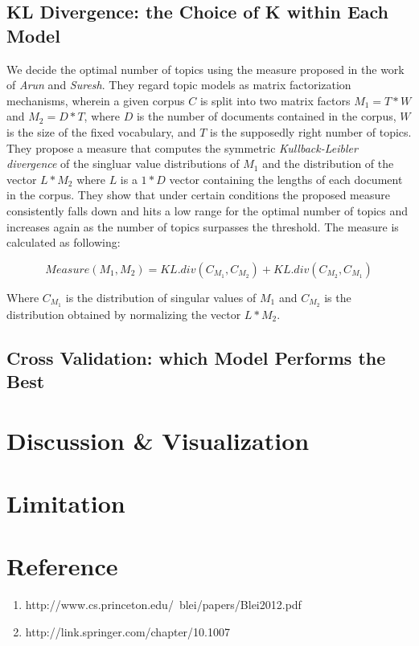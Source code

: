 \documentclass[9pt,notitlepage]{article}		%
\begin{document}
\subsection{KL Divergence: the Choice of K within Each Model}
We decide the optimal number of topics using the measure proposed in the work of \textit{Arun} and \textit{Suresh}. They regard topic models as matrix factorization mechanisms, wherein a given corpus $C$ is split into two matrix factors $M_1=T*W$ and $M_2=D*T$, where $D$ is the number of documents contained in the corpus, $W$ is the size of the fixed vocabulary, and $T$ is the supposedly right number of topics. They propose a measure that computes the symmetric \textit{Kullback-Leibler divergence} of the singluar value distributions of $M_1$ and the distribution of the vector $L*M_2$ where $L$ is a $1*D$ vector containing the lengths of each document in the corpus. They show that under certain conditions the proposed measure consistently falls down and hits a low range for the optimal number of topics and increases again as the number of topics surpasses the threshold. The measure is calculated as following: 

\begin{equation}
Measure (M_1, M_2) = KL.div(C_{M_1}, C_{M_2}) + KL.div(C_{M_2}, C_{M_1})
\end{equation}

Where $C_{M_1}$ is the distribution of singular values of $M_1$ and $C_{M_2}$ is the distribution obtained by normalizing the vector $L*M_2$. 

\subsection{Cross Validation: which Model Performs the Best}

 \hspace{0.5cm} \vspace{0.3cm}
\section{Discussion \& Visualization}
 \hspace{0.5cm} \vspace{0.3cm}
\section{Limitation}
\section{Reference}
\begin{enumerate}
\item http://www.cs.princeton.edu/~blei/papers/Blei2012.pdf
\item http://link.springer.com/chapter/10.1007%
\end{enumerate}
\end{document}

